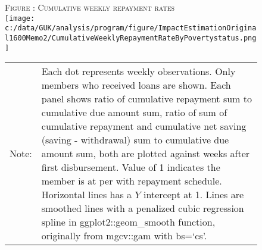 \begin{figure}
\hfil\textsc{\footnotesize Figure \thefigure: Cumulative weekly repayment rates\label{fig weeklysavingrepayrate}}\\
\hfil\texttt{[image: c:/data/GUK/analysis/program/figure/ImpactEstimationOriginal1600Memo2/CumulativeWeeklyRepaymentRateByPovertystatus.png]}\\
\renewcommand{\arraystretch}{1}
\hfil\begin{tabular}{>{\hfill\scriptsize}p{1cm}<{}>{\scriptsize}p{12cm}<{\hfill}}
Note:& Each dot represents weekly observations. Only members who received loans are shown. Each panel shows ratio of cumulative repayment sum to cumulative due amount sum, ratio of sum of cumulative repayment and cumulative net saving (saving - withdrawal) sum to cumulative due amount sum, both are plotted against weeks after first disbursement. Value of 1 indicates the member is at per with repayment schedule. Horizontal lines has a $Y$ intercept at 1. Lines are smoothed lines with a penalized cubic regression spline in \textsf{ggplot2::geom\_smooth} function, originally from \textsf{mgcv::gam} with \textsf{bs=`cs'}. \\[-1ex]
\end{tabular}
\end{figure}



